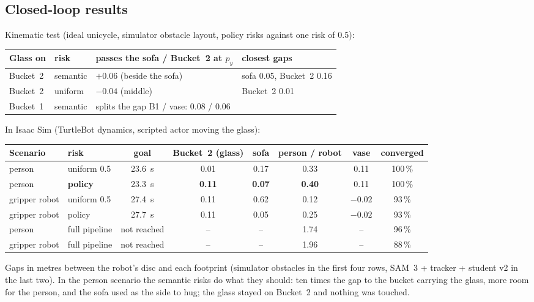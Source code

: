 \documentclass[10pt,a4paper]{article}
\begin{document}
\subsection{Closed-loop results}\label{sec:closed}
Kinematic test (ideal unicycle, simulator obstacle layout, policy risks against one risk of 0.5):
\begin{center}\small
\begin{tabular}{llll}
\toprule
Glass on & risk & passes the sofa / Bucket~2 at $p_y$ & closest gaps \\
\midrule
Bucket~2 & semantic & $+0.06$ (beside the sofa) & sofa 0.05, Bucket~2 0.16 \\
Bucket~2 & uniform & $-0.04$ (middle) & Bucket~2 0.01 \\
Bucket~1 & semantic & splits the gap B1 / vase: 0.08 / 0.06 & \\
\bottomrule
\end{tabular}
\end{center}

In Isaac Sim (TurtleBot dynamics, scripted actor moving the glass):
\begin{center}\small
\begin{tabular}{llcccccc}
\toprule
Scenario & risk & goal & Bucket~2 (glass) & sofa & person / robot & vase & converged \\
\midrule
person & uniform 0.5 & 23.6~s & 0.01 & 0.17 & 0.33 & 0.11 & 100\,\% \\
person & \textbf{policy} & 23.3~s & \textbf{0.11} & \textbf{0.07} & \textbf{0.40} & 0.11 & 100\,\% \\
gripper robot & uniform 0.5 & 27.4~s & 0.11 & 0.62 & 0.12 & $-0.02$ & 93\,\% \\
gripper robot & policy & 27.7~s & 0.11 & 0.05 & 0.25 & $-0.02$ & 93\,\% \\
person & full pipeline & not reached & -- & -- & 1.74 & -- & 96\,\% \\
gripper robot & full pipeline & not reached & -- & -- & 1.96 & -- & 88\,\% \\
\bottomrule
\end{tabular}
\end{center}
Gaps in metres between the robot's disc and each footprint (simulator obstacles in the first four rows, SAM~3 + tracker + student
v2 in the last two). In the person scenario the semantic risks do what they should: ten times the gap to the bucket carrying the
glass, more room for the person, and the sofa used as the side to hug; the glass stayed on Bucket~2 and nothing was touched.
\end{document}
